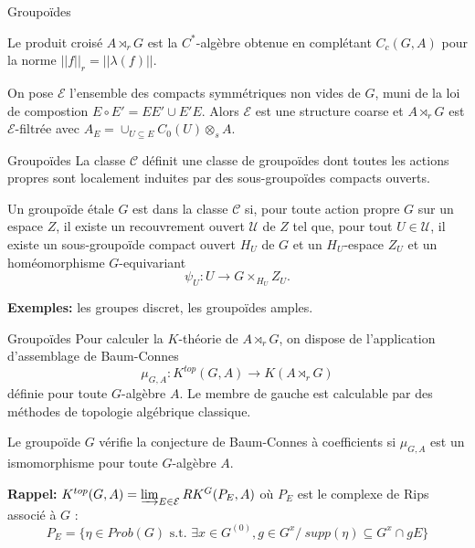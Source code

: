 \begin{frame}{Groupoïdes}
\begin{definitionfr}
Le produit croisé $A\rtimes_r G$ est la $C^*$-algèbre obtenue en complétant $C_c(G,A)$ pour la norme $||f||_r=||\lambda(f)||$.
\end{definitionfr}
\vspace{0.3 cm}
On pose $\mathcal E$ l'ensemble des compacts symmétriques non vides de $G$, muni de la loi de compostion $E\circ E' = EE' \cup E'E$. Alors $\mathcal E$ est une structure coarse et $A\rtimes_r G$ est $\mathcal E$-filtrée avec $A_E = \cup_{U\subseteq E	} C_0(U)\otimes_s A$. 
\end{frame}

\begin{frame}{Groupoïdes}
La classe $\mathcal C$ définit une classe de groupoïdes dont toutes les actions propres sont localement induites par des sous-groupoïdes compacts ouverts. 
\vspace{0.3 cm}
\begin{definitionfr}
Un groupoïde étale $G$ est dans la classe $\mathcal C$ si, pour toute action propre $G$ sur un espace $Z$, il existe un recouvrement ouvert $\mathcal U$ de $Z$ tel que, pour tout $U\in\mathcal U$, il existe un sous-groupoïde compact ouvert $H_U$ de $G$ et un $H_U$-espace $Z_U$ et un homéomorphisme $G$-equivariant
\[\psi_U : U \rightarrow G\times_{H_U} Z_U.\] 
\end{definitionfr}
\vspace{0.3 cm}
\textbf{Exemples:} les groupes discret, les groupoïdes amples.

\end{frame}

\begin{frame}{Groupoïdes}
Pour calculer la $K$-théorie de $A\rtimes_r G$, on dispose de l'application d'assemblage de Baum-Connes
\[\mu_{G,A} : K^{top}(G,A) \rightarrow K(A \rtimes_r G)\]
définie pour toute $G$-algèbre $A$. Le membre de gauche est calculable par des méthodes de topologie algébrique classique.
\vspace{0.3 cm}
\begin{conj}
Le groupoïde $G$ vérifie la conjecture de Baum-Connes à coefficients si $\mu_{G,A}$ est un ismomorphisme pour toute $G$-algèbre $A$.
\end{conj}
\vspace{0.3 cm}
\textbf{Rappel:} $K^{top}(G,A)=\varinjlim_{E\in \mathcal E} RK^G(P_E,A)$ où $P_E$ est le complexe de Rips associé à $G$ :
\[P_E = \{\eta\in Prob(G) \text{ s.t. } \exists x\in G^{(0)},g\in G^x / \ supp (\eta) \subseteq G^x \cap gE  \}\]
\end{frame}

